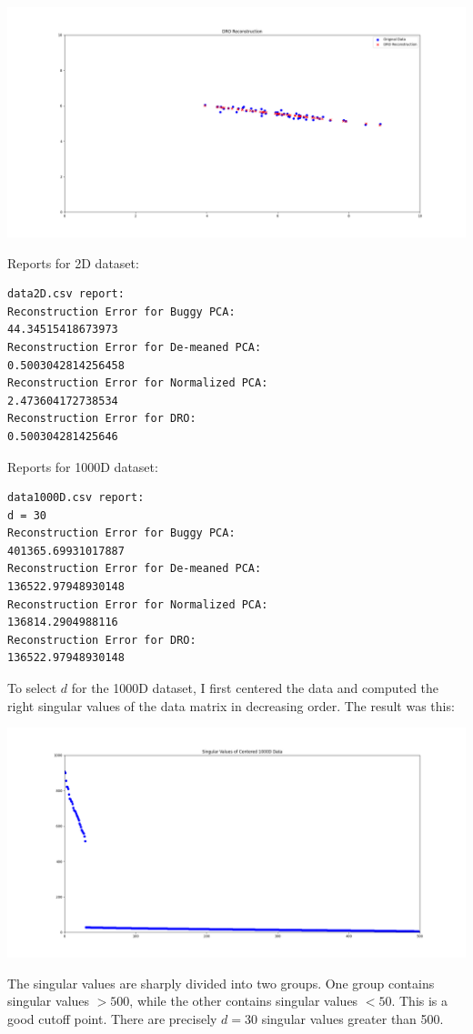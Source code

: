 \documentclass[a4paper]{article}
\theoremstyle{definition}
\newenvironment{soln}{
    \leavevmode\color{blue}\ignorespaces
}{}
\begin{document}
\begin{soln}
\begin{center}
    \includegraphics[width=\linewidth]{DRO.png}
  \end{center}

  Reports for 2D dataset:

\begin{verbatim}
data2D.csv report:
Reconstruction Error for Buggy PCA:
44.34515418673973
Reconstruction Error for De-meaned PCA:
0.5003042814256458
Reconstruction Error for Normalized PCA:
2.473604172738534
Reconstruction Error for DRO:
0.500304281425646
\end{verbatim}

  Reports for 1000D dataset:
\begin{verbatim}
data1000D.csv report:
d = 30
Reconstruction Error for Buggy PCA:
401365.69931017887
Reconstruction Error for De-meaned PCA:
136522.97948930148
Reconstruction Error for Normalized PCA:
136814.2904988116
Reconstruction Error for DRO:
136522.97948930148
\end{verbatim}



To select $d$ for the 1000D dataset, I first centered the data and computed the right singular values of the data matrix in decreasing order. The result was this:
\begin{center}
  \includegraphics[width=\linewidth]{1000D_SV.png}
\end{center}
The singular values are sharply divided into two groups. One group contains singular values $>500$, while the other contains singular values $<50$. This is a good cutoff point. There are precisely $d=30$ singular values greater than 500.


\end{soln}
\end{document}
